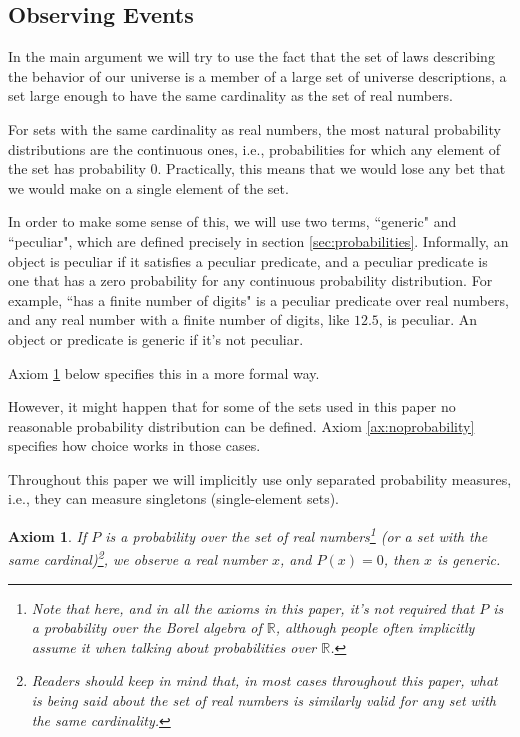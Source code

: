 \documentclass[a4paper
,draft
]{article}
\def\reale{\mathbb{R}}
\newcommand{\paper}[1]{paper}
\newcommand{\ghilimele}[1]{``#1"}
\newtheorem{axiom}{Axiom}
\begin{document}
\subsection{Observing Events}
In the main argument we will try to use the fact that the set of laws describing
the behavior of our universe is a member of a large set of universe
descriptions, a set large enough to have the same cardinality as the set of
real numbers.

For sets with the same cardinality as real numbers,
the most natural probability distributions are the continuous
ones, i.e., probabilities for which any element of the set has probability $0$.
Practically, this means that we would lose any bet that we would make on a
single element of the set.

In order to make some sense of this, we will use two terms,
\ghilimele{generic} and \ghilimele{peculiar},
which are defined precisely in section \ref{sec:probabilities}.
Informally,
an object is peculiar if it satisfies a peculiar predicate, and a peculiar
predicate is one that has a zero probability for any continuous probability
distribution.
For example, \ghilimele{has a finite number of digits} is a peculiar
predicate over real numbers, and any real number with a finite number
of digits, like $12.5$, is peculiar. An object or predicate is generic if
it's not peculiar.

Axiom \ref{ax:zeroisgeneric} below specifies this in a more formal way.

However, it might happen that for some of the sets used in this \paper{}
no reasonable probability distribution can be defined.
Axiom \ref{ax:noprobability} specifies how choice works in those cases.

Throughout this paper we will implicitly use only separated probability
measures, i.e., they can measure singletons (single-element sets).

\begin{axiom}
  \label{ax:zeroisgeneric}
  If $P$ is a probability over the set of real numbers\footnote{Note
    that here, and in all the axioms in this paper, it's not required that
    $P$ is a probability over the
    Borel algebra of $\reale$, although people often implicitly
    assume it when talking about probabilities over $\reale$.
  }
  (or a set with the same cardinal)\footnote{
    Readers should
    keep in mind that, in most cases throughout this paper, what is being said
    about the set of real numbers is similarly valid for any set with the same
    cardinality.},
  we observe a real number $x$, and $P(x)=0$, then $x$ is generic.
\end{axiom}
\end{document}
